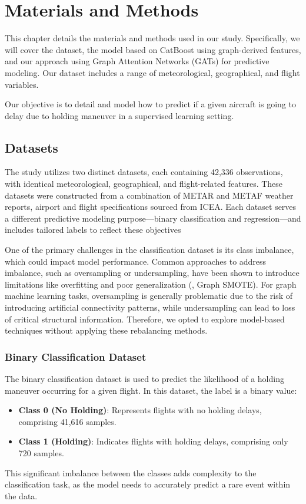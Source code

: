 \chapter[Materials and Methods]{Materials and Methods}
\label{Materials}

This chapter details the materials and methods used in our
study. Specifically, we will cover the dataset, the model based on
CatBoost using graph-derived features, and our approach using Graph
Attention Networks (GATs) for predictive modeling. Our dataset
includes a range of meteorological, geographical, and flight
variables.

Our objective is to detail and model how to predict if a given
aircraft is going to delay due to holding maneuver in a supervised
learning setting.

\section{Datasets}
\label{Datasets}

The study utilizes two distinct datasets, each containing 42,336
observations, with identical meteorological, geographical, and
flight-related features. These datasets were constructed from a
combination of METAR and METAF weather reports, airport and flight
specifications sourced from ICEA. Each dataset serves a different
predictive modeling purpose—binary classification and regression—and
includes tailored labels to reflect these objectives

One of the primary challenges in the classification dataset is its
class imbalance, which could impact model performance. Common
approaches to address imbalance, such as oversampling or
undersampling, have been shown to introduce limitations like
overfitting and poor generalization (\cite{zhao2021graphsmote}, Graph
SMOTE). For graph machine learning tasks, oversampling is generally
problematic due to the risk of introducing artificial connectivity
patterns, while undersampling can lead to loss of critical structural
information. Therefore, we opted to explore model-based techniques
without applying these rebalancing methods.

\subsection{Binary Classification Dataset} The binary classification
dataset is used to predict the likelihood of a holding maneuver
occurring for a given flight. In this dataset, the label is a binary
value:
\begin{itemize}
    \item \textbf{Class 0 (No Holding)}: Represents flights with no
    holding delays, comprising 41,616 samples.
    \item \textbf{Class 1 (Holding)}: Indicates flights with holding
    delays, comprising only 720 samples.
\end{itemize} This significant imbalance between the classes adds
complexity to the classification task, as the model needs to
accurately predict a rare event within the data.

